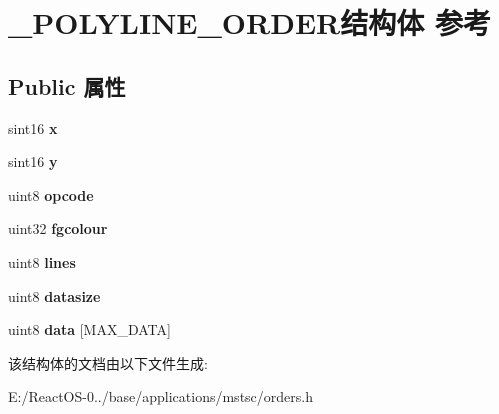 \hypertarget{struct___p_o_l_y_l_i_n_e___o_r_d_e_r}{}\section{\+\_\+\+P\+O\+L\+Y\+L\+I\+N\+E\+\_\+\+O\+R\+D\+E\+R结构体 参考}
\label{struct___p_o_l_y_l_i_n_e___o_r_d_e_r}
\subsection*{Public 属性}
\begin{DoxyCompactItemize}
\item 
\mbox{\label{struct___p_o_l_y_l_i_n_e___o_r_d_e_r_a52dcee03e090c8b2a572412060cdb9fb}} 
sint16 {\bfseries x}
\item 
\mbox{\label{struct___p_o_l_y_l_i_n_e___o_r_d_e_r_a51561362e5a29a75e66885f5014145be}} 
sint16 {\bfseries y}
\item 
\mbox{\label{struct___p_o_l_y_l_i_n_e___o_r_d_e_r_ad84fdcbb7d502dd7a54495ecdc691c21}} 
uint8 {\bfseries opcode}
\item 
\mbox{\label{struct___p_o_l_y_l_i_n_e___o_r_d_e_r_a8472b0cca594095c9fe8e24ce366aefc}} 
uint32 {\bfseries fgcolour}
\item 
\mbox{\label{struct___p_o_l_y_l_i_n_e___o_r_d_e_r_a406455f69322910cbc929b060cee50ad}} 
uint8 {\bfseries lines}
\item 
\mbox{\label{struct___p_o_l_y_l_i_n_e___o_r_d_e_r_ab107cd0054197b32d9dd53bac2488c1c}} 
uint8 {\bfseries datasize}
\item 
\mbox{\label{struct___p_o_l_y_l_i_n_e___o_r_d_e_r_abe170e52b7d5fa48ec068b074a42420d}} 
uint8 {\bfseries data} \mbox{[}M\+A\+X\+\_\+\+D\+A\+TA\mbox{]}
\end{DoxyCompactItemize}


该结构体的文档由以下文件生成\+:\begin{DoxyCompactItemize}
\item 
E\+:/\+React\+O\+S-\/0../base/applications/mstsc/orders.\+h\end{DoxyCompactItemize}
